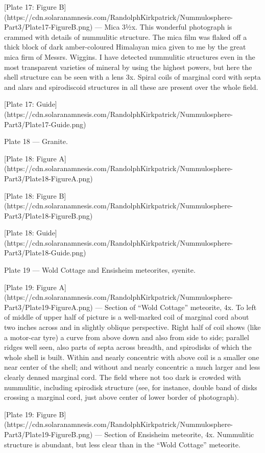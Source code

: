 \documentclass[a4paper, 12pt, oneside]{article}
\begin{document}
[Plate 17: Figure B](https://cdn.solaranamnesis.com/RandolphKirkpatrick/Nummulosphere-Part3/Plate17-FigureB.png) --- Mica 3½x. This wonderful photograph is crammed with details of nummulitic structure. The mica film was flaked off a thick block of dark amber-coloured Himalayan mica given to me by the great mica firm of Messrs. Wiggins. I have detected nummulitic structures even in the most transparent varieties of mineral by using the highest powers, but here the shell structure can be seen with a lens 3x. Spiral coils of marginal cord with septa and alars and spirodiscoid structures in all these are present over the whole field.

[Plate 17: Guide](https://cdn.solaranamnesis.com/RandolphKirkpatrick/Nummulosphere-Part3/Plate17-Guide.png)

Plate 18 --- Granite.

[Plate 18: Figure A](https://cdn.solaranamnesis.com/RandolphKirkpatrick/Nummulosphere-Part3/Plate18-FigureA.png)

[Plate 18: Figure B](https://cdn.solaranamnesis.com/RandolphKirkpatrick/Nummulosphere-Part3/Plate18-FigureB.png)

[Plate 18: Guide](https://cdn.solaranamnesis.com/RandolphKirkpatrick/Nummulosphere-Part3/Plate18-Guide.png)

Plate 19 --- Wold Cottage and Ensisheim meteorites, syenite.

[Plate 19: Figure A](https://cdn.solaranamnesis.com/RandolphKirkpatrick/Nummulosphere-Part3/Plate19-FigureA.png) --- Section of ``Wold Cottage'' meteorite, 4x. To left of middle of upper half of picture is a well-marked coil of marginal cord about two inches across and in slightly oblique perspective. Right half of coil shows (like a motor-car tyre) a curve from above down and also from side to side; parallel ridges well seen, also parts of septa across breadth, and spirodisks of which the whole shell is built. Within and nearly concentric with above coil is a smaller one near center of the shell; and without and nearly concentric a much larger and less clearly denned marginal cord. The field where not too dark is crowded with nummulitic, including spirodisk structure (see, for instance, double band of disks crossing a marginal cord, just above center of lower border of photograph).

[Plate 19: Figure B](https://cdn.solaranamnesis.com/RandolphKirkpatrick/Nummulosphere-Part3/Plate19-FigureB.png) --- Section of Ensisheim meteorite, 4x. Nummulitic structure is abundant, but less clear than in the ``Wold Cottage'' meteorite.
\end{document}
